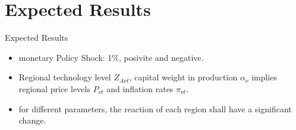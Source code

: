 \documentclass[../quali_slides.tex]{subfiles}
\begin{document}
\section{Expected Results}
	
	
\begin{frame}[fragile]{Expected Results}
		
		\begin{itemize}
			
			\item monetary Policy Shock: 1\%, posivite and negative.
			
			\item Regional technology level $Z_{A\nu t}$, capital weight in production $\alpha_{\nu}$ implies regional price levels $P_{\nu t}$ and inflation rates $\pi_{\nu t}$.
			
			\item for different parameters, the reaction of each region shall have a significant change.
			
		\end{itemize}
		
	\end{frame}
\end{document}
